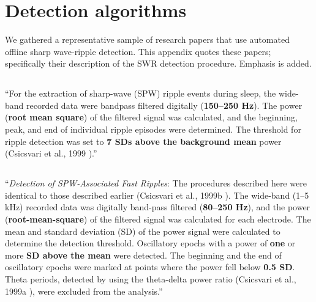 \clearpage
\section{Detection algorithms}
\label{apx:SWR-detection-literature}

We gathered a representative sample of research papers that use automated offline sharp wave-ripple detection. This appendix quotes these papers; specifically their description of the SWR detection procedure. Emphasis is added.


\subsection{}

``For the extraction of sharp-wave (SPW) ripple events during sleep, the wide-band recorded data were bandpass filtered digitally (\textbf{150–250 Hz}). The power (\textbf{root mean square}) of the filtered signal was calculated, and the beginning, peak, and end of individual ripple episodes were determined. The threshold for ripple detection was set to \textbf{7 SDs above the background mean} power (Csicsvari et al., 1999 \cite{Csicsvari1999}).'' \cite{Nadasdy1999}


\subsection{}

``\emph{Detection of SPW-Associated Fast Ripples}: The procedures described here were identical to those described earlier (Csicsvari et al., 1999b \cite{Csicsvari1999a}). The wide-band (1–5 kHz) recorded data was digitally band-pass filtered (\textbf{80–250 Hz}), and the power (\textbf{root-mean-square}) of the filtered signal was calculated for each electrode. The mean and standard deviation (SD) of the power signal were calculated to determine the detection threshold. Oscillatory epochs with a power of \textbf{one} or more \textbf{SD above the mean} were detected. The beginning and the end of oscillatory epochs were marked at points where the power fell below \textbf{0.5 SD}. Theta periods, detected by using the theta-delta power ratio (Csicsvari et al., 1999a \cite{Csicsvari1999}), were excluded from the analysis.'' \cite{Csicsvari2000}


\subsection{}

